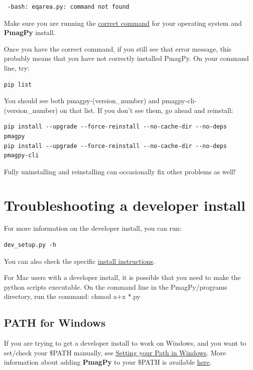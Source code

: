 \documentclass[11pt]{book}
\begin{document}
{{\begin{verbatim} -bash: eqarea.py: command not found
\end{verbatim}

Make sure you are running the \href{#which_command}{correct command} for your operating system and {\bf PmagPy} install.

Once you have the correct command, if you still see that error message, this probably means that you have not correctly installed PmagPy.  On your command line, try:

\begin{verbatim}
pip list
\end{verbatim}

You should see both pmagpy-(version\_number) and pmagpy-cli-(version\_number) on that list.  If you don't see them, go ahead and reinstall:

\begin{verbatim}
pip install --upgrade --force-reinstall --no-cache-dir --no-deps pmagpy
pip install --upgrade --force-reinstall --no-cache-dir --no-deps pmagpy-cli
\end{verbatim}

Fully uninstalling and reinstalling can occasionally fix other problems as well!


\section{Troubleshooting a developer install}

For more information on the developer install, you can run:
\begin{verbatim}
dev_setup.py -h
\end{verbatim}

You can also check the specific \href{#getting_python}{install instructions}.

For Mac users with a developer install, it is possible that you need to make the python scripts executable. On the command line in the PmagPy/programs directory, run the command: chmod a+x *.py

\subsection{PATH for Windows}

If you are trying to get a developer install to work on Windows, and you want to set/check your \$PATH manually, see \href{http://www.mathworks.com/matlabcentral/answers/94933-how-do-i-set-my-system-path-under-windows}{Setting your Path in Windows}.  More information about adding {\bf PmagPy} to your \$PATH is available \href{#setting_path}{here}.

}}
\end{document}
